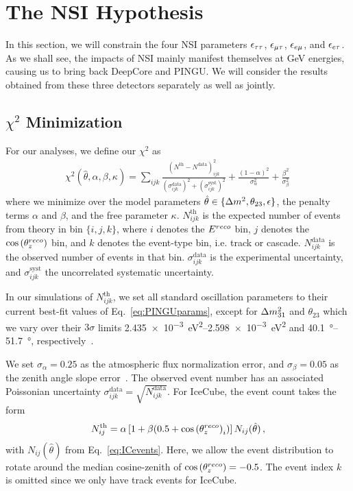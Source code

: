 \section{The NSI Hypothesis}\label{sec:constraining}
In this section, we will constrain the four NSI parameters $\epsilon_{\tau\tau}$, $\epsilon_{\mu\tau}$, $\epsilon_{e\mu}$, and $\epsilon_{e\tau}$. As we shall see, the impacts of NSI mainly manifest
themselves at \si{\GeV} energies, causing us to bring back DeepCore and PINGU. We will consider the results obtained from these three detectors separately as well as jointly.

\subsection{\texorpdfstring{$\chi^2$}{Chi-squared} Minimization}
\label{sec:nsi_chi2}
For our analyses, we define our $\chi^2$ as
\begin{align}\label{eq:chisq_NSI}
    \chi^{2}(\hat{\theta},\alpha,\beta, \kappa)=\sum_{ijk} \frac{\left(N^\text{th}-N^\text{data}\right)_{ijk}^{2}}
    {\left(\sigma^\text{data}_{ijk}\right)^{2} + \left(\sigma^\text{syst}_{ijk}\right)^{2}}+ 
    \frac{(1-\alpha)^2}{\sigma_\alpha^2} + \frac{\beta^2}{\sigma_\beta^2}\,
\end{align}
where we minimize over the model parameters $\hat{\theta} \in \{\dm, \theta_{23}, \epsilon\}$, the penalty terms $\alpha$ and $\beta$, and the free parameter $\kappa$.
$N_{ijk}^\text{th}$ is the expected number of events from theory in bin $\{i,j,k\}$, where $i$ denotes the $E^{reco}$ bin, $j$ denotes the $\cos{(\theta_z^{reco})}$ bin,
and $k$ denotes the event-type bin, i.e. track or cascade. 
$N_{ijk}^\text{data}$ is the observed number of events in that bin. $\sigma^\text{data}_{ijk}$ is the experimental uncertainty, and $\sigma^\text{syst}_{ijk}$ the uncorrelated systematic
uncertainty.

In our simulations of $N_{ijk}^\text{th}$, we set all standard oscillation parameters to their current best-fit values of Eq.~\ref{eq:PINGUparams}, 
except for $\dm[31]$ and $\theta_{23}$
which we vary over their $3\sigma$ limits \SIrange{2.435e-3}{2.598e-3}{\eV\squared} and \SIrange{40.1}{51.7}{\degree}, respectively~\cite{nufit}.

We set $\sigma_\alpha = 0.25$ as the atmospheric flux normalization error, and $\sigma_\beta = 0.05$ as the zenith angle slope error~\cite{hondapaper}. 
The observed event number has an associated Poissonian uncertainty $\sigma_{ijk}^\text{data} = \sqrt{N_{ijk}^\text{data}}$.
For IceCube, the event count takes the form
\begin{align}
    N^\text{th}_{ij} = \alpha\left[1+\beta (0.5 + \cos{(\theta_z^{reco})}_i )\right] N_{ij}(\hat{\theta})\,,
\end{align}
with $N_{ij}(\hat{\theta})$ from Eq.~\ref{eq:ICevents}. Here, we allow the event distribution to rotate around the median cosine-zenith of $\cos{(\theta_z^{reco})} = -0.5$. 
The event index $k$ is omitted since we only have track events for IceCube.

